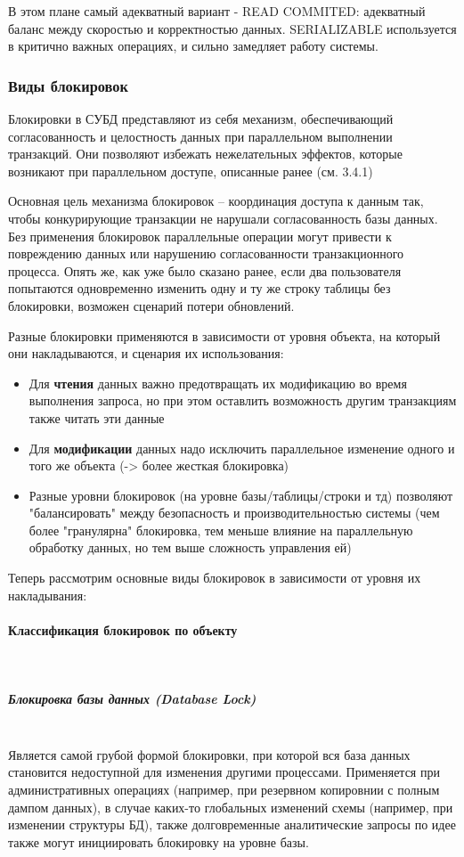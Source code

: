  В этом плане самый адекватный вариант - READ COMMITED: адекватный баланс между скоростью и корректностью данных. SERIALIZABLE используется в критично важных операциях, и сильно замедляет работу системы.
 
 \subsubsection{Виды блокировок}
 
 Блокировки в СУБД представляют из себя механизм, обеспечивающий согласованность и целостность данных при параллельном выполнении транзакций. Они позволяют избежать нежелательных эффектов, которые возникают при параллельном доступе, описанные ранее (см. 3.4.1)
 
 Основная цель механизма блокировок – координация доступа к данным так, чтобы конкурирующие транзакции не нарушали согласованность базы данных. Без применения блокировок параллельные операции могут привести к повреждению данных или нарушению согласованности транзакционного процесса. Опять же, как уже было сказано ранее, если два пользователя попытаются одновременно изменить одну и ту же строку таблицы без блокировки, возможен сценарий потери обновлений.
 
 Разные блокировки применяются в зависимости от уровня объекта, на который они накладываются, и сценария их использования:
 
 \begin{itemize}
     \item Для \textbf{чтения} данных важно предотвращать их модификацию во время выполнения запроса, но при этом оставлить возможность другим транзакциям также читать эти данные
     \item Для \textbf{модификации} данных надо исключить параллельное изменение одного и того же объекта (-> более жесткая блокировка)
     \item Разные уровни блокировок (на уровне базы/таблицы/строки и тд) позволяют "балансировать" между безопасность и производительностью системы (чем более "гранулярна" блокировка, тем меньше влияние на параллельную обработку данных, но тем выше сложность управления ей) \autocite[ch.22]{ElmasriNavathe}
 \end{itemize}
 
 Теперь рассмотрим основные виды блокировок в зависимости от уровня их накладывания:
 
 \paragraph{Классификация блокировок по объекту} ~\\
 \subparagraph{Блокировка базы данных (Database Lock)} ~\\
 Является самой грубой формой блокировки, при которой вся база данных становится недоступной для изменения другими процессами. Применяется при административных операциях (например, при резервном копировнии с полным дампом данных), в случае каких-то глобальных изменений схемы (например, при изменении структуры БД), также долговременные аналитические запросы по идее также могут инициировать блокировку на уровне базы.
 
